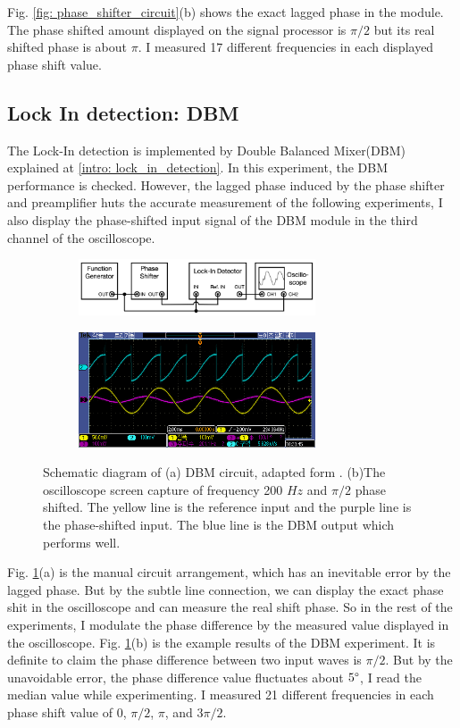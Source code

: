 \documentclass{article}
\begin{document}
 Fig. \ref{fig: phase_shifter_circuit}(b) shows the exact lagged phase in the module.
 The phase shifted amount displayed on the signal processor is $\pi/2$ but its real shifted phase is about $\pi$.
 I measured 17 different frequencies in each displayed phase shift value.

 \subsection{Lock In detection: DBM}
 The Lock-In detection is implemented by Double Balanced Mixer(DBM) explained at \ref{intro: lock_in_detection}.
 In this experiment, the DBM performance is checked.
 However, the lagged phase induced by the phase shifter and preamplifier huts the accurate measurement of the following experiments,
 I also display the phase-shifted input signal of the DBM module in the third channel of the oscilloscope.
 \begin{figure}[ht]
    \centering
    \begin{subfigure}[b]{7cm}
        \centering
        \includegraphics[width=7cm]{../results/DBM_circuit.png}
        \caption{}
    \end{subfigure}
    \hfill
    \begin{subfigure}[b]{7cm}
        \centering
        \includegraphics[width=7cm]{../raw_data/TEK00396.PNG}
        \caption{}
    \end{subfigure}
    \hfill
    \caption{Schematic diagram of (a) DBM circuit, adapted form  \cite{signal_processor}.
    (b)The oscilloscope screen capture of frequency 200 $Hz$ and $\pi/2$ phase shifted.
    The yellow line is the reference input and the purple line is the phase-shifted input.
    The blue line is the DBM output which performs well.
    }
    \label{fig: DBM_circuit}
  \end{figure}
 Fig. \ref{fig: DBM_circuit}(a) is the manual circuit arrangement, which has an inevitable error by the lagged phase.
 But by the subtle line connection, we can display the exact phase shit in the oscilloscope and can measure the real shift phase.
 So in the rest of the experiments, I modulate the phase difference by the measured value displayed in the oscilloscope.
 Fig. \ref{fig: DBM_circuit}(b) is the example results of the DBM experiment.
 It is definite to claim the phase difference between two input waves is $\pi/2$.
 But by the unavoidable error, the phase difference value fluctuates about $5\degree$, I read the median value while experimenting.
 I measured 21 different frequencies in each phase shift value of 0, $\pi/2$, $\pi$, and $3\pi/2$.
\end{document}
